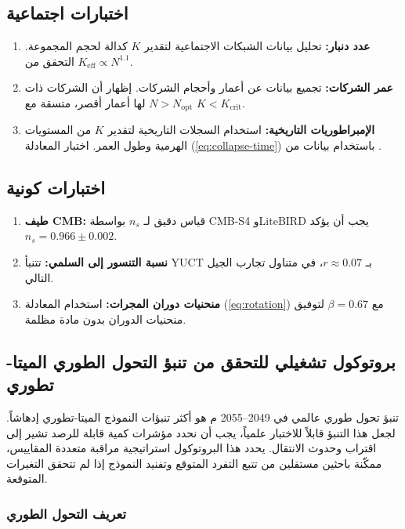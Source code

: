 \documentclass[11pt,a4paper]{article}
\newcommand{\Keff}{K_{\mathrm{eff}}}
\begin{document}
	\subsection{اختبارات اجتماعية}
	
	\begin{enumerate}
		\item \textbf{عدد دنبار:} تحليل بيانات الشبكات الاجتماعية لتقدير \(K\) كدالة لحجم المجموعة. التحقق من \(\Keff \propto N^{1.1}\).
		\item \textbf{عمر الشركات:} تجميع بيانات عن أعمار وأحجام الشركات. إظهار أن الشركات ذات \(N > N_{\text{opt}}\) لها أعمار أقصر، متسقة مع \(K < K_{\text{crit}}\).
		\item \textbf{الإمبراطوريات التاريخية:} استخدام السجلات التاريخية لتقدير \(K\) من المستويات الهرمية وطول العمر. اختبار المعادلة (\ref{eq:collapse-time}) باستخدام بيانات من \cite{TurchinNefedov2009}.
	\end{enumerate}
	
	\subsection{اختبارات كونية}
	
	\begin{enumerate}
		\item \textbf{طيف CMB:} قياس دقيق لـ \(n_s\) بواسطة CMB-S4 وLiteBIRD يجب أن يؤكد \(n_s = 0.966 \pm 0.002\).
		\item \textbf{نسبة التنسور إلى السلمي:} تتنبأ YUCT بـ \(r \approx 0.07\)، في متناول تجارب الجيل التالي.
		\item \textbf{منحنيات دوران المجرات:} استخدام المعادلة (\ref{eq:rotation}) مع \(\beta = 0.67\) لتوفيق منحنيات الدوران بدون مادة مظلمة.
	\end{enumerate}
	
	\subsection{بروتوكول تشغيلي للتحقق من تنبؤ التحول الطوري الميتا-تطوري}
	\label{subsec:forecast-protocol}
	
	تنبؤ تحول طوري عالمي في 2049–2055 م هو أكثر تنبؤات النموذج الميتا-تطوري إدهاشاً. لجعل هذا التنبؤ قابلاً للاختبار علمياً، يجب أن نحدد مؤشرات كمية قابلة للرصد تشير إلى اقتراب وحدوث الانتقال. يحدد هذا البروتوكول استراتيجية مراقبة متعددة المقاييس، ممكّنة باحثين مستقلين من تتبع التفرد المتوقع وتفنيد النموذج إذا لم تتحقق التغيرات المتوقعة.
	
	\subsubsection{تعريف التحول الطوري}
	
\end{document}

